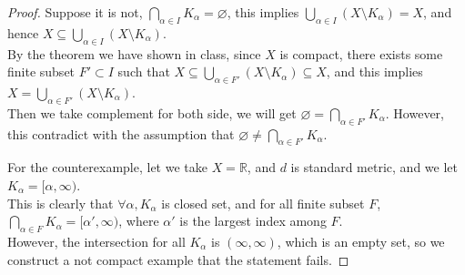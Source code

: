 \begin{proof}
    Suppose it is not, $\bigcap_{\alpha \in I} K_\alpha = \varnothing$, this implies $\bigcup_{\alpha \in I} (X \setminus K_\alpha) = X$, and hence $X \subseteq \bigcup_{\alpha \in I} (X \setminus K_\alpha)$. \\
    By the theorem we have shown in class, since $X$ is compact, there exists some finite subset $F'\subset I$ such that $X \subseteq \bigcup_{\alpha \in F'} (X \setminus K_\alpha) \subseteq X$, and this implies $X = \bigcup_{\alpha \in F'} (X \setminus K_\alpha)$. \\
    Then we take complement for both side, we will get $\varnothing = \bigcap_{\alpha \in F'} K_\alpha$. However, this contradict with the assumption that $\varnothing \neq \bigcap_{\alpha \in F'} K_\alpha$.

    For the counterexample, let we take $X = \mathbb{R}$, and $d$ is standard metric, and we let $K_{\alpha} = [\alpha, \infty)$. \\
    This is clearly that $\forall \alpha, K_{\alpha}$ is closed set, and for all finite subset $F$, $\bigcap_{\alpha \in F} K_\alpha = [\alpha', \infty)$, where $\alpha' $ is the largest index among $F$. \\
    However, the intersection for all $K_{\alpha}$ is $(\infty, \infty)$, which is an empty set, so we construct a not compact example that the statement fails.
\end{proof}

